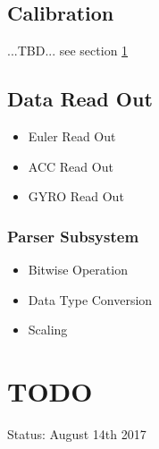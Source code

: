 \documentclass[a4paper]{article}
\begin{document}
\subsection{Calibration}
...TBD... see section \ref{todo}

\subsection{Data Read Out}
\begin{itemize}
\item Euler Read Out
\item ACC Read Out
\item GYRO Read Out
\end{itemize}

\subsubsection{Parser Subsystem}

\begin{itemize}
\item Bitwise Operation
\item Data Type Conversion
\item Scaling
\end{itemize}



\section{TODO} \label{todo}

 Status: August 14th 2017
 
\end{document}
